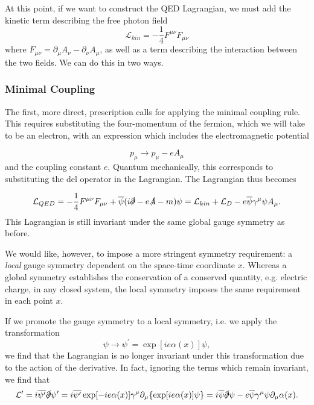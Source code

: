 \documentclass[10pt,a4paper]{book}
\begin{document}
At this point, if we want to construct the QED Lagrangian, we must add the kinetic term describing the free photon field
\begin{equation}
\mathcal{L}_{kin} = -\frac{1}{4}F^{\mu\nu}F_{\mu\nu}
\label{kinetic term}
\end{equation}
where $F_{\mu\nu} = \partial_\mu A_\nu - \partial_\nu A_\mu$, as well as a term describing the interaction between the two fields. We can do this in two ways. 

\subsubsection{Minimal Coupling}

The first, more direct, prescription calls for applying the minimal coupling rule. This requires substituting the four-momentum of the fermion, which we will take to be an electron, with an expression which includes the electromagnetic potential

\begin{equation}
p_\mu \rightarrow p_\mu - eA_\mu
\end{equation}
and the coupling constant $e$. Quantum mechanically, this corresponds to substituting the del operator in the Lagrangian. The Lagrangian thus becomes

\begin{equation}
\label{QED lagrangian}
\mathcal{L}_{QED} = -\frac{1}{4}F^{\mu\nu}F_{\mu\nu} + \overline{\psi}(i\slashed{\partial} - e\slashed{A} - m)\psi = \mathcal{L}_{kin} + \mathcal{L}_D - e\overline{\psi}\gamma^\mu \psi A_\mu.
\end{equation}
This Lagrangian is still invariant under the same global gauge symmetry as before. 

We would like, however, to impose a more stringent symmetry requirement: a \emph{local} gauge symmetry dependent on the space-time coordinate $x$. Whereas a global symmetry establishes the conservation of a conserved quantity, e.g. electric charge, in any closed system, the local symmetry imposes the same requirement in each point $x$. 

If we promote the gauge symmetry to a local symmetry, i.e. we apply the transformation 
\begin{equation}
\psi \rightarrow \psi^\prime = \exp[ie\alpha(x)]\psi,
\label{fermi-field transformation}
\end{equation} 
we find that the Lagrangian is no longer invariant under this transformation due to the action of the derivative. In fact, ignoring the terms which remain invariant, we find that
\begin{equation}
\mathcal{L}^\prime = i\overline{\psi^\prime} \slashed{\partial} \psi^\prime = i\overline{\psi^\prime} \exp[-ie\alpha(x)] \gamma^\mu \partial_\mu \lbrace \exp[ie\alpha(x)]\psi \rbrace = i\overline{\psi}\slashed{\partial}\psi - e\overline{\psi}\gamma^\mu\psi\partial_\mu\alpha(x).
\label{local gauge}
\end{equation}
\end{document}
